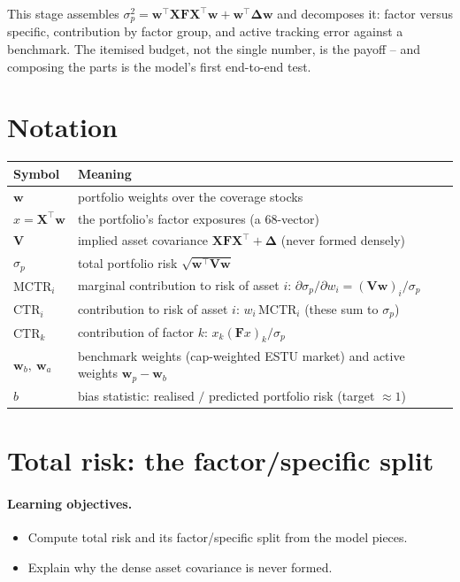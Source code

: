 \documentclass[11pt]{article}
\theoremstyle{definition}
\theoremstyle{plain}
\theoremstyle{remark}
\newcommand{\T}{^{\!\top}}
\newcommand{\wvec}{\mathbf{w}}
\newcommand{\Xmat}{\mathbf{X}}
\newcommand{\Fmat}{\mathbf{F}}
\newcommand{\Vmat}{\mathbf{V}}
\newcommand{\Del}{\boldsymbol{\Delta}}
\begin{document}
\begin{keyresult}
This stage assembles $\sigma_p^2=\wvec\T\Xmat\Fmat\Xmat\T\wvec+\wvec\T\Del\wvec$ and decomposes it: factor versus specific, contribution by factor group, and active tracking error against a benchmark. The itemised budget, not the single number, is the payoff -- and composing the parts is the model's first end-to-end test.
\end{keyresult}

\section*{Notation}

\begin{center}
\begin{tabular}{@{}ll@{}}
\toprule
Symbol & Meaning \\
\midrule
$\wvec$ & portfolio weights over the coverage stocks \\
$x=\Xmat\T\wvec$ & the portfolio's factor exposures (a $68$-vector) \\
$\Vmat$ & implied asset covariance $\Xmat\Fmat\Xmat\T+\Del$ (never formed densely) \\
$\sigma_p$ & total portfolio risk $\sqrt{\wvec\T\Vmat\wvec}$ \\
$\text{MCTR}_i$ & marginal contribution to risk of asset $i$: $\partial\sigma_p/\partial w_i = (\Vmat\wvec)_i/\sigma_p$ \\
$\text{CTR}_i$ & contribution to risk of asset $i$: $w_i\,\text{MCTR}_i$ (these sum to $\sigma_p$) \\
$\text{CTR}_k$ & contribution of factor $k$: $x_k(\Fmat x)_k/\sigma_p$ \\
$\wvec_b,\ \wvec_a$ & benchmark weights (cap-weighted ESTU market) and active weights $\wvec_p-\wvec_b$ \\
$b$ & bias statistic: realised $/$ predicted portfolio risk (target $\approx 1$) \\
\bottomrule
\end{tabular}
\end{center}

\section{Total risk: the factor/specific split}\label{sec:total}

\paragraph{Learning objectives.}
\begin{itemize}[leftmargin=1.4em,topsep=2pt]
  \item Compute total risk and its factor/specific split from the model pieces.
  \item Explain why the dense asset covariance is never formed.
\end{itemize}
\end{document}
